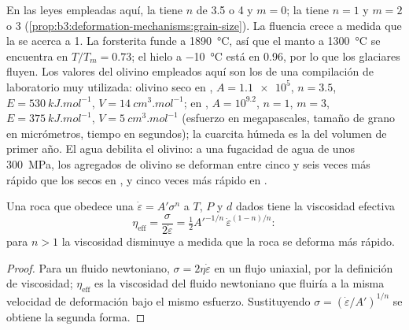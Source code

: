 En las leyes empleadas aquí, la  tiene $n$ de 3.5 o 4 y $m = 0$;
la  tiene $n = 1$ y $m = 2$ o 3 (\cref{prop:b3:deformation-mechanisms:grain-size}).
La fluencia crece a medida que la  se acerca a 1. La forsterita funde a \qty{1890}{\celsius}, así que el manto a \qty{1300}{\celsius}
se encuentra en $T/T_m = 0.73$; el hielo a \qty{-10}{\celsius} está en 0.96, por lo que
los glaciares fluyen. Los valores del olivino empleados aquí son los de una compilación
de laboratorio muy utilizada: olivino seco en , $A =
\num{1.1e5}$, $n = 3.5$, $E = \qty{530}{kJ.mol^{-1}}$, $V =
\qty{14}{cm^3.mol^{-1}}$; en , $A = 10^{9.2}$, $n = 1$, $m = 3$,
$E = \qty{375}{kJ.mol^{-1}}$, $V = \qty{5}{cm^3.mol^{-1}}$ (esfuerzo en megapascales,
tamaño de grano en micrómetros, tiempo en segundos); la cuarcita húmeda es la del volumen
de primer año. El agua debilita el olivino: a una fugacidad de agua de unos
\qty{300}{MPa}, los agregados de olivino se deforman entre cinco y seis veces más rápido que los secos
en , y cinco veces más rápido en .

\begin{proposition}\label{prop:b3:deformation-mechanisms:viscosity}
Una roca que obedece una  $\dot\varepsilon = A'\sigma^n$ a $T$, $P$ y
$d$ dados tiene la viscosidad efectiva
\[
  \eta_{\mathrm{eff}} = \frac{\sigma}{2\dot\varepsilon}
  = \tfrac12A'^{-1/n}\,\dot\varepsilon^{(1-n)/n}:
\]
para $n > 1$ la viscosidad disminuye a medida que la roca se deforma más rápido.
\end{proposition}

\begin{proof}
Para un fluido newtoniano, $\sigma = 2\eta\dot\varepsilon$ en un flujo uniaxial, por la
definición de viscosidad; $\eta_{\mathrm{eff}}$ es la viscosidad del fluido newtoniano
que fluiría a la misma velocidad de deformación bajo el mismo esfuerzo. Sustituyendo
$\sigma = (\dot\varepsilon/A')^{1/n}$ se obtiene la segunda forma.
\end{proof}

